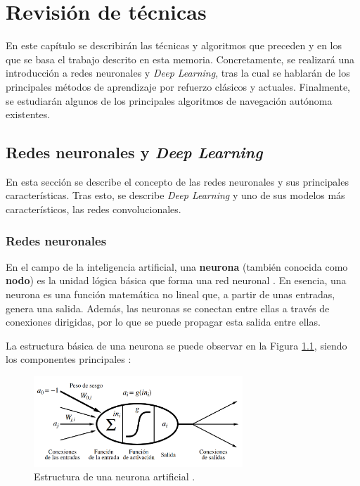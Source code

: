 \chapter{Revisión de técnicas}
En este capítulo se describirán las técnicas y algoritmos que preceden y en los que se basa el trabajo descrito en esta memoria. Concretamente, se realizará una introducción a redes neuronales y \textit{Deep Learning}, tras la cual se hablarán de los principales métodos de aprendizaje por refuerzo clásicos y actuales. Finalmente, se estudiarán algunos de los principales algoritmos de navegación autónoma existentes.

\section{Redes neuronales y \textit{Deep Learning}}

En esta sección se describe el concepto de las redes neuronales y sus principales características. Tras esto, se describe \textit{Deep Learning} y uno de sus modelos más característicos, las redes convolucionales.

\subsection{Redes neuronales}
En el campo de la inteligencia artificial, una \textbf{neurona} (también conocida como \textbf{nodo}) es la unidad lógica básica que forma una red neuronal \cite{alma991004256519704990}. En esencia, una neurona es una función matemática no lineal que, a partir de unas entradas, genera una salida. Además, las neuronas se conectan entre ellas a través de conexiones dirigidas, por lo que se puede propagar esta salida entre ellas.

La estructura básica de una neurona se puede observar en la Figura \ref{fig:chap3-neuron}, siendo los componentes principales \cite{alma991004256519704990}:

\begin{figure}[h]
    \centering
    \includegraphics[width=0.7\textwidth]{imagenes/cap3/neuron.png}
    \caption{Estructura de una neurona artificial \cite{alma991004256519704990}.}
    \label{fig:chap3-neuron}
\end{figure}

